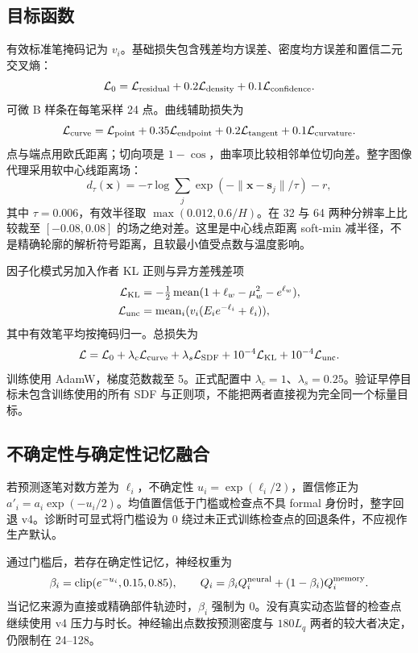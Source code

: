 \documentclass[UTF8,a4paper,11pt,fontset=fandol]{ctexart}
\newcommand{\clip}{\operatorname{clip}}
\newcommand{\mean}{\operatorname{mean}}
\begin{document}
\subsection{目标函数}
有效标准笔掩码记为 $v_i$。基础损失包含残差均方误差、密度均方误差和置信二元交叉熵：
\begin{equation}
\mathcal L_0=\mathcal L_{\rm residual}+0.2\mathcal L_{\rm density}+0.1\mathcal L_{\rm confidence}.
\end{equation}
可微 B 样条在每笔采样 24 点。曲线辅助损失为
\begin{equation}
\mathcal L_{\rm curve}=\mathcal L_{\rm point}+0.35\mathcal L_{\rm endpoint}
+0.2\mathcal L_{\rm tangent}+0.1\mathcal L_{\rm curvature}.
\end{equation}
点与端点用欧氏距离；切向项是 $1-\cos$，曲率项比较相邻单位切向差。整字图像代理采用软中心线距离场：
\begin{equation}
d_\tau(\bm{x})=-\tau\log\sum_j\exp\left(-\|\bm{x}-\bm{s}_j\|/\tau\right)-r,
\end{equation}
其中 $\tau=0.006$，有效半径取 $\max(0.012,0.6/H)$。在 32 与 64 两种分辨率上比较裁至 $[-0.08,0.08]$ 的场之绝对差。这里是中心线点距离 soft-min 减半径，不是精确轮廓的解析符号距离，且软最小值受点数与温度影响。

因子化模式另加入作者 KL 正则与异方差残差项
\begin{align}
\mathcal L_{\rm KL}&=-\tfrac12\mean(1+\ell_w-\mu_w^2-e^{\ell_w}),\\
\mathcal L_{\rm unc}&=\mean_i(v_i(E_i e^{-\ell_i}+\ell_i)),
\end{align}
其中有效笔平均按掩码归一。总损失为
\begin{equation}
\mathcal L=\mathcal L_0+\lambda_c\mathcal L_{\rm curve}+\lambda_s\mathcal L_{\rm SDF}
+10^{-4}\mathcal L_{\rm KL}+10^{-4}\mathcal L_{\rm unc}.
\end{equation}
训练使用 AdamW，梯度范数裁至 5。正式配置中 $\lambda_c=1$、$\lambda_s=0.25$。验证早停目标未包含训练使用的所有 SDF 与正则项，不能把两者直接视为完全同一个标量目标。

\subsection{不确定性与确定性记忆融合}
若预测逐笔对数方差为 $\ell_i$，不确定性 $u_i=\exp(\ell_i/2)$，置信修正为 $a'_i=a_i\exp(-u_i/2)$。均值置信低于门槛或检查点不具 formal 身份时，整字回退 v4。诊断时可显式将门槛设为 0 绕过未正式训练检查点的回退条件，不应视作生产默认。

通过门槛后，若存在确定性记忆，神经权重为
\begin{equation}
\beta_i=\clip(e^{-u_i},0.15,0.85),\qquad
Q_i=\beta_iQ_i^{\rm neural}+(1-\beta_i)Q_i^{\rm memory}.
\end{equation}
当记忆来源为直接或精确部件轨迹时，$\beta_i$ 强制为 0。没有真实动态监督的检查点继续使用 v4 压力与时长。神经输出点数按预测密度与 $180L_q$ 两者的较大者决定，仍限制在 24--128。
\end{document}
